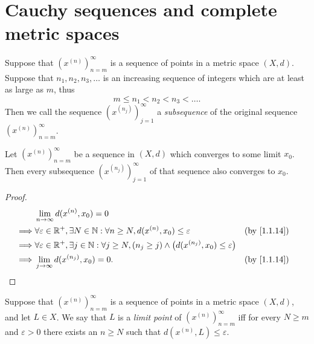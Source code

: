 \section{Cauchy sequences and complete metric spaces}\label{sec:1.4}

\begin{defn}[Subsequences]\label{1.4.1}
  Suppose that \((x^{(n)})_{n = m}^\infty\) is a sequence of points in a metric space \((X, d)\).
  Suppose that \(n_1, n_2, n_3, \dots\) is an increasing sequence of integers which are at least as large as \(m\), thus
  \[
    m \leq n_1 < n_2 < n_3 < \dots.
  \]
  Then we call the sequence \((x^{(n_j)})_{j = 1}^\infty\) a \emph{subsequence} of the original sequence \((x^{(n)})_{n = m}^\infty\).
\end{defn}

\setcounter{thm}{2}
\begin{lem}\label{1.4.3}
  Let \((x^{(n)})_{n = m}^\infty\) be a sequence in \((X, d)\) which converges to some limit \(x_0\).
  Then every subsequence \((x^{(n_j)})_{j = 1}^\infty\) of that sequence also converges to \(x_0\).
\end{lem}

\begin{proof}
  \begin{align*}
             & \lim_{n \to \infty} d(x^{(n)}, x_0) = 0                                                                                                             \\
    \implies & \forall \varepsilon \in \R^+, \exists N \in \N : \forall n \geq N, d(x^{(n)}, x_0) \leq \varepsilon                                &  & \by{1.1.14} \\
    \implies & \forall \varepsilon \in \R^+, \exists j \in \N : \forall j \geq N, (n_j \geq j) \land \big(d(x^{(n_j)}, x_0) \leq \varepsilon\big)                  \\
    \implies & \lim_{j \to \infty} d(x^{(n_j)}, x_0) = 0.                                                                                         &  & \by{1.1.14}
  \end{align*}
\end{proof}

\begin{defn}\label{1.4.4}
  Suppose that \((x^{(n)})_{n = m}^\infty\) is a sequence of points in a metric space \((X, d)\), and let \(L \in X\).
  We say that \(L\) is a \emph{limit point} of \((x^{(n)})_{n = m}^\infty\) iff for every \(N \geq m\) and \(\varepsilon > 0\) there exists an \(n \geq N\) such that \(d(x^{(n)}, L) \leq \varepsilon\).
\end{defn}

